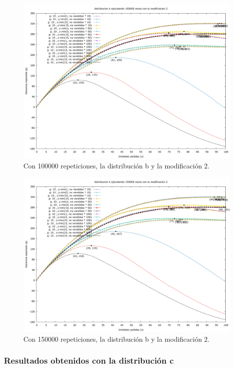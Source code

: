 \documentclass[12pt, spanish]{article}
\begin{document}
\begin{figure}[H]
	\centering
	\includegraphics[scale = 0.2]{prob_b/datos_b_100000_2.png}
	\caption{Con 100000 repeticiones, la distribución b y la modificación 2.}
	\label{fig:ej1_a_100000}

\end{figure}

\begin{figure}[H]
	\centering
	\includegraphics[scale = 0.2]{prob_b/datos_b_150000_2.png}
	\caption{Con 150000 repeticiones, la distribución b y la modificación 2.}
	\label{fig:ej1_a_150000}

\end{figure}

\subsubsection{Resultados obtenidos con la distribución c}
\end{document}
